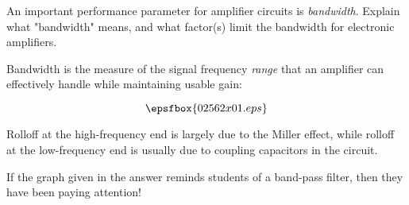 

An important performance parameter for amplifier circuits is {\it bandwidth}.  Explain what "bandwidth" means, and what factor(s) limit the bandwidth for electronic amplifiers.







Bandwidth is the measure of the signal frequency {\it range} that an amplifier can effectively handle while maintaining usable gain:

$$\epsfbox{02562x01.eps}$$

Rolloff at the high-frequency end is largely due to the Miller effect, while rolloff at the low-frequency end is usually due to coupling capacitors in the circuit.







If the graph given in the answer reminds students of a band-pass filter, then they have been paying attention!




